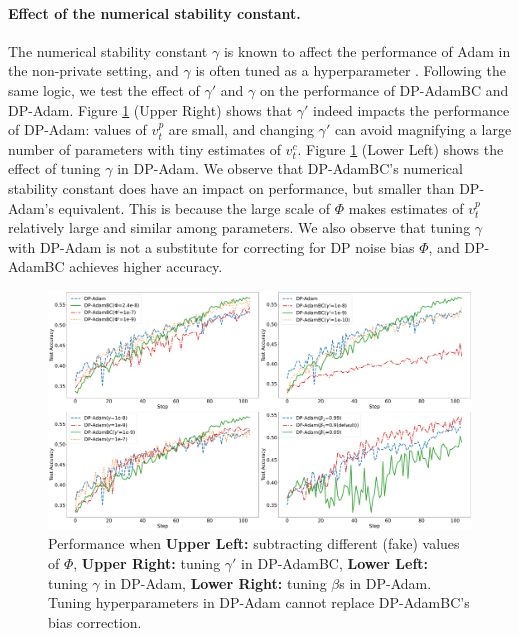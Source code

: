\documentclass[letterpaper]{article} %
\begin{document}
\paragraph{Effect of the numerical stability constant.}
The numerical stability constant $\gamma$ is known to affect the performance of Adam in the non-private setting, and $\gamma$ is often tuned as a hyperparameter \citep{Reddi2019}. Following the same logic, we test the effect of $\gamma'$ and $\gamma$ on the performance of DP-AdamBC and DP-Adam. Figure \ref{fig:exp3_4} (Upper Right) shows that $\gamma'$ indeed impacts the performance of DP-Adam: values of $v_t^{p}$ are small, and changing $\gamma'$ can avoid magnifying a large number of parameters with tiny estimates of $v_t^{c}$.
Figure \ref{fig:exp3_4} (Lower Left) shows the effect of tuning $\gamma$ in DP-Adam. We observe that DP-AdamBC's numerical stability constant does have an impact on performance, but smaller than DP-Adam's equivalent. This is because the large scale of $\Phi$ makes estimates of $v_t^{p}$ relatively large and similar among parameters. We also observe that tuning $\gamma$ with DP-Adam is not a substitute for correcting for DP noise bias $\Phi$, and DP-AdamBC achieves higher accuracy.

\begin{figure}[htb]
\centering
\includegraphics[width=0.9\linewidth]{figs/type1_exp_hyper.pdf}
\caption{Performance when \textbf{Upper Left: }subtracting different (fake) values of $\Phi$,
\textbf{Upper Right: }tuning $\gamma'$ in DP-AdamBC, \textbf{Lower Left: }tuning $\gamma$ in DP-Adam, \textbf{Lower Right: }tuning $\beta$s in DP-Adam. Tuning hyperparameters in DP-Adam cannot replace DP-AdamBC's bias correction.
}
\label{fig:exp3_4}
\end{figure}
\end{document}
